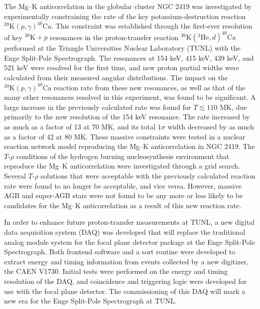 The Mg--K anticorrelation in the globular cluster NGC 2419 was investigated by experimentally constraining the rate of the key potassium-destruction reaction $^{39}\mathrm{K}(p,\gamma)^{40}\mathrm{Ca}$. This constraint was established through the first-ever resolution of key $^{39}\mathrm{K}+p$ resonances in the proton-transfer reaction $^{39}\mathrm{K}(^{3}\mathrm{He},d)^{40}\mathrm{Ca}$ performed at the Triangle Universities Nuclear Laboratory (TUNL) with the Enge Split-Pole Spectrograph. The resonances at 154 keV, 415 keV, 439 keV, and 521 keV were resolved for the first time, and new proton partial widths were calculated from their measured angular distributions. The impact on the $^{39}\mathrm{K}(p,\gamma)^{40}\mathrm{Ca}$ reaction rate from these new resonances, as well as that of the many other resonances resolved in this experiment, was found to be significant. A large increase in the previously calculated rate was found for $T \lesssim 110$ MK, due primarily to the new resolution of the 154 keV resonance. The rate increased by as much as a factor of 13 at 70 MK, and its total $1\sigma$ width decreased by as much as a factor of 42 at 80 MK. These massive constraints were tested in a nuclear reaction network model reproducing the Mg--K anticorrelation in NGC 2419. The $T$-$\rho$ conditions of the hydrogen burning nucleosynthesis environment that reproduce the Mg--K anticorrelation were investigated through a grid search. Several $T$-$\rho$ solutions that were acceptable with the previously calculated reaction rate were found to no longer be acceptable, and vice versa. However, massive AGB and super-AGB stars were not found to be any more or less likely to be candidates for the Mg--K anticorrelation as a result of this new reaction rate.

In order to enhance future proton-transfer measurements at TUNL, a new digital data acquisition system (DAQ) was developed that will replace the traditional analog module system for the focal plane detector package at the Enge Split-Pole Spectrograph. Both frontend software and a sort routine were developed to extract energy and timing information from events collected by a new digitizer, the CAEN V1730. Initial tests were performed on the energy and timing resolution of the DAQ, and coincidence and triggering logic were developed for use with the focal plane detector. The commissioning of this DAQ will mark a new era for the Enge Split-Pole Spectrograph at TUNL.